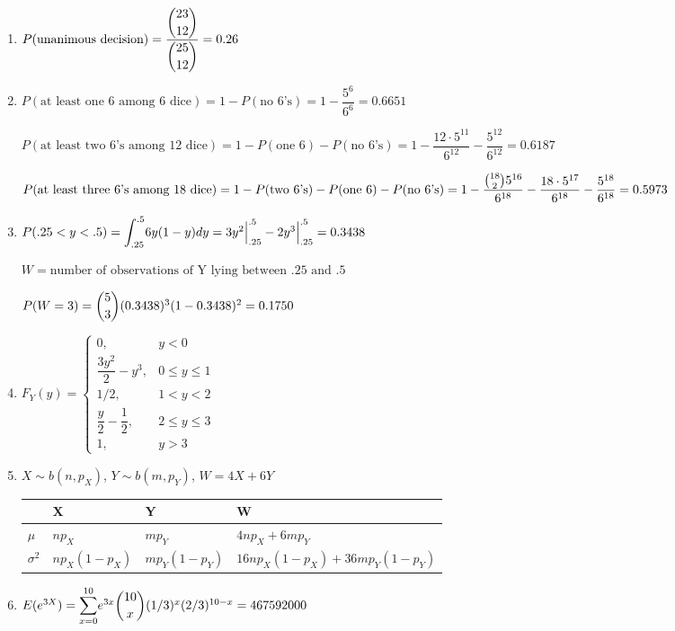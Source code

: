 \documentclass{article}
\newcommand\lint{\mathlarger{\int}}
\newcommand\lsum{\mathlarger{\sum}}
\begin{document}
\begin{enumerate}
     \item
      $P(\text{unanimous decision}) = \dfrac{\dbinom{23}{12}}{\dbinom{25}{12}} = 0.26$
     
     \item
      $P(\text{at least one 6 among 6 dice}) = 1 - P(\text{no 6's}) = 1 - \dfrac{5^6}{6^6} 
	= 0.6651$
	
      $P(\text{at least two 6's among 12 dice}) = 1 - P(\text{one 6}) - P(\text{no 6's})
	= 1 - \dfrac{12 \cdot 5^{11}}{6^{12}} - \dfrac{5^{12}}{6^{12}} 
	= 0.6187$
	
      $P(\text{at least three 6's among 18 dice}) = 1 - P(\text{two 6's}) - P(\text{one 6}) 
	  - P(\text{no 6's}) \\
	= 1 - \dfrac{\binom{18}{2}5^{16}}{6^{18}} - \dfrac{18 \cdot 5^{17}}{6^{18}}
	  - \dfrac{5^{18}}{6^{18}}
	= 0.5973$
     
     \item
      $P(.25 < y < .5) = \lint_{.25}^{.5} {6y(1 - y) dy} = 3y^2\Big|_{.25}^{.5} - 2y^3\Big|_{.25}^{.5}
	= 0.3438$
	
      $W = \text{number of observations of Y lying between .25 and .5}$
      
      $P(W = 3) = \dbinom{5}{3}(0.3438)^3(1-0.3438)^2 = 0.1750$
     
     \item
      $F_Y(y) =
	\begin{cases}
	  0,			 & y < 0 \\
	  \dfrac{3y^2}{2} - y^3, & 0 \le y \le 1 \\
	  1/2,			 & 1 < y < 2 \\
	  \dfrac{y}{2} - \dfrac{1}{2}, & 2 \le y \le 3 \\
	  1, 			 & y > 3
	\end{cases}
      $
     
     \item
      $X \sim b(n, p_X)$, $Y \sim b(m, p_Y)$, $W = 4X + 6Y$ 
      
      \begin{tabular}{l | l | l | l}
	           & X             & Y             & W \\
	           \hline
	$\mu$      & $np_X$        & $mp_Y$        & $4np_X + 6mp_Y$ \\
	$\sigma^2$ & $np_X(1-p_X)$ & $mp_Y(1-p_Y)$ & $16np_X(1-p_X) + 36mp_Y(1-p_Y)$
      \end{tabular}
     
     \item
      $E(e^{3X}) = \lsum_{x=0}^{10} {e^{3x} \dbinom{10}{x}(1/3)^x(2/3)^{10-x}} = 467592000$
     

\end{enumerate}
\end{document}
